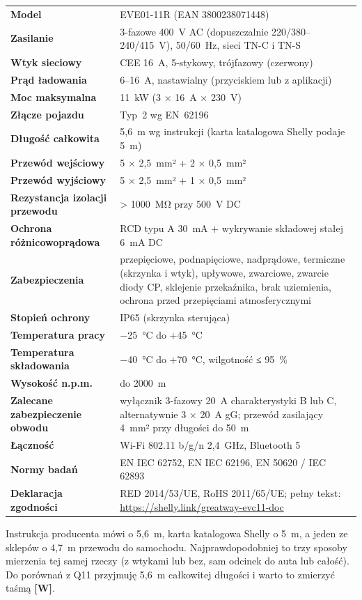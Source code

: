 \documentclass[11pt,a4paper]{article}
\newcommand{\tagW}{\textcolor{apamber}{\textbf{[W]}}}
\begin{document}
\begin{tabularx}{\textwidth}{>{\bfseries}p{4.6cm}X}
\toprule
Model & EVE01-11R (EAN 3800238071448) \\
Zasilanie & 3-fazowe 400~V AC (dopuszczalnie 220/380–240/415~V), 50/60~Hz, sieci TN-C i TN-S \\
Wtyk sieciowy & CEE 16~A, 5-stykowy, trójfazowy (czerwony) \\
Prąd ładowania & 6–16~A, nastawialny (przyciskiem lub z aplikacji) \\
Moc maksymalna & 11~kW (3 × 16~A × 230~V) \\
Złącze pojazdu & Typ~2 wg EN~62196 \\
Długość całkowita & 5,6~m wg instrukcji (karta katalogowa Shelly podaje 5~m) \\
Przewód wejściowy & 5 × 2,5~mm² + 2 × 0,5~mm² \\
Przewód wyjściowy & 5 × 2,5~mm² + 1 × 0,5~mm² \\
Rezystancja izolacji przewodu & > 1000~MΩ przy 500~V DC \\
Ochrona różnicowoprądowa & RCD typu A 30~mA + wykrywanie składowej stałej 6~mA DC \\
Zabezpieczenia & przepięciowe, podnapięciowe, nadprądowe, termiczne (skrzynka i wtyk), upływowe, zwarciowe, zwarcie diody CP, sklejenie przekaźnika, brak uziemienia, ochrona przed przepięciami atmosferycznymi \\
Stopień ochrony & IP65 (skrzynka sterująca) \\
Temperatura pracy & −25~°C do +45~°C \\
Temperatura składowania & −40~°C do +70~°C, wilgotność ≤ 95~\% \\
Wysokość n.p.m. & do 2000~m \\
Zalecane zabezpieczenie obwodu & wyłącznik 3-fazowy 20~A charakterystyki B lub C, alternatywnie 3 × 20~A gG; przewód zasilający 4~mm² przy długości do 50~m \\
Łączność & Wi-Fi 802.11 b/g/n 2,4~GHz, Bluetooth 5 \\
Normy badań & EN IEC 62752, EN IEC 62196, EN 50620 / IEC 62893 \\
Deklaracja zgodności & RED 2014/53/UE, RoHS 2011/65/UE; pełny tekst: \url{https://shelly.link/greatway-evc11-doc} \\
\bottomrule
\end{tabularx}

\begin{uwaga}
Instrukcja producenta mówi o 5,6~m, karta katalogowa Shelly o 5~m, a jeden ze sklepów o 4,7~m przewodu do samochodu. Najprawdopodobniej to trzy sposoby mierzenia tej samej rzeczy (z wtykami lub bez, sam odcinek do auta lub całość). Do porównań z Q11 przyjmuję 5,6~m całkowitej długości i warto to zmierzyć taśmą \tagW.
\end{uwaga}
\end{document}
